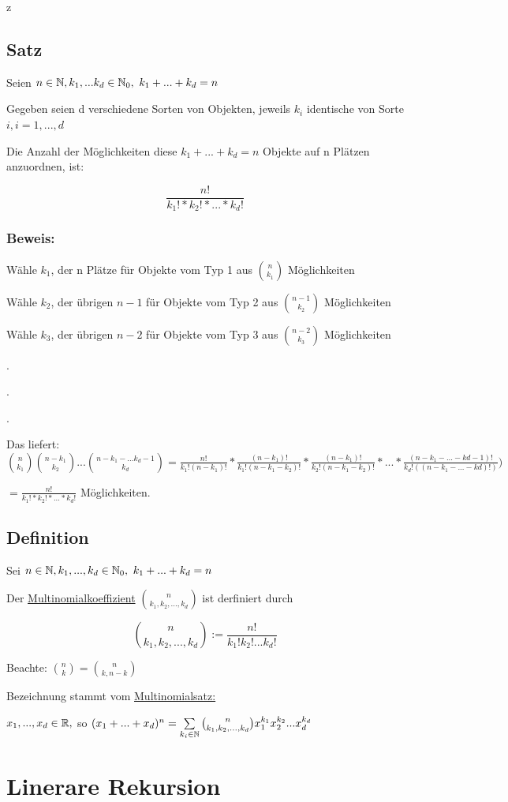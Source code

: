 z\subsection{Satz}
Seien $n \in \operatorname{\mathbb{N}} , k_1,...k_d \in \operatorname{\mathbb{N}}_0,~ k_1+...+k_d=n $

Gegeben seien d verschiedene Sorten von Objekten, jeweils $k_i$ identische von Sorte $i, i=1,...,d$

Die Anzahl der Möglichkeiten diese $k_1+...+k_d = n$ Objekte auf n Plätzen anzuordnen, ist:

$$ \frac{n!}{k_1!*k_2!*...*k_d!}$$ 

\subsubsection*{Beweis:}
Wähle $k_1$, der n Plätze für Objekte vom Typ 1 aus $\binom{n}{k_1}$ Möglichkeiten

Wähle $k_2$, der übrigen $n-1$ für Objekte vom Typ 2 aus $\binom{n-1}{k_2}$ Möglichkeiten

Wähle $k_3$, der übrigen $n-2$ für Objekte vom Typ 3 aus $\binom{n-2}{k_3}$ Möglichkeiten


.

.

.


Das liefert: $\binom{n}{k_1}\binom{n-k_1}{k_2}...\binom{n-k_1-...k_d-1}{k_d} = \frac{n!}{k_1!(n-k_1)!}*\frac{(n-k_1)!}{k_1!(n-k_1-k_2)!}*\frac{(n-k_1)!}{k_2!(n-k_1-k_2)!}*...*\frac{(n-k_1-...-k{d-1})!}{k_d!((n-k_1-...-k{d})!)}) $

$= \frac{n!}{k_1!*k_2!*...*k_d!}$ Möglichkeiten.

\subsection{Definition}
Sei $n \in \operatorname{\mathbb{N}}, k_1,...,k_d \in \operatorname{\mathbb{N}}_0,~ k_1+...+k_d = n$

Der \underline{Multinomialkoeffizient} $\binom{n}{k_1,k_2,...,k_d}$ ist derfiniert durch

$$\binom{n}{k_1,k_2,...,k_d} := \frac{n!}{k_1!k_2!...k_d!} $$

Beachte: $\binom{n}{k} = \binom{n}{k,n-k}$

Bezeichnung stammt vom \underline{Multinomialsatz:}

$x_1,...,x_d \in \operatorname{\mathbb{R}},$ so $(x_1+...+x_d)^n= \sum_{k_i \in \N}\binom{n}{k_1,k_2,...,k_d}x_1^{k_1}x_2^{k_2}...x_d^{k_d}$

\section{Linerare Rekursion}
